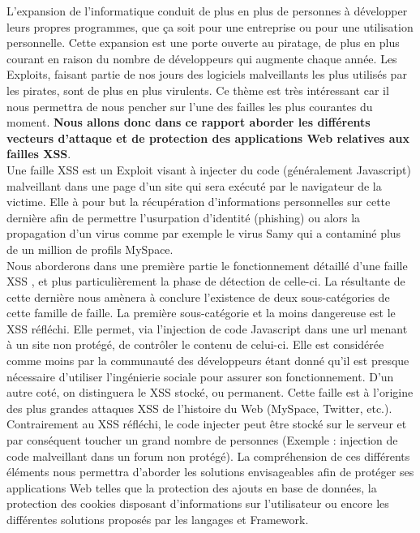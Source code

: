 \documentclass[a4paper,12pt]{report}
\begin{document}
L’expansion de l’informatique conduit de plus en plus de personnes à développer leurs propres programmes, que ça soit pour une entreprise ou pour une utilisation personnelle. Cette expansion est une porte ouverte au piratage, de plus en plus courant en raison du nombre de développeurs qui augmente chaque année. Les Exploits, faisant partie de nos jours des logiciels malveillants les plus utilisés par les pirates, sont de plus en plus virulents.
Ce thème est très intéressant car il nous permettra de nous pencher sur l'une des failles les plus courantes du moment. \textbf{Nous allons donc dans ce rapport aborder les différents vecteurs d'attaque et de protection des applications Web relatives aux failles XSS}.\\

Une faille XSS est un Exploit visant à injecter du code (généralement Javascript) malveillant dans une page d'un site qui sera exécuté par le navigateur de la victime. Elle à pour but la récupération d'informations personnelles sur cette dernière afin de permettre l'usurpation d'identité (phishing) ou alors la propagation d'un virus comme par exemple le virus Samy qui a  contaminé plus de un million de profils MySpace. \\

Nous aborderons dans une première partie le fonctionnement détaillé d'une faille XSS , et plus particulièrement la phase de détection de celle-ci. La résultante de cette dernière nous amènera à conclure l'existence de deux sous-catégories de cette famille de faille. La première sous-catégorie et la moins dangereuse est le XSS réfléchi. Elle permet, via l'injection de code Javascript dans une url menant à un site non protégé, de contrôler le contenu de celui-ci. Elle est considérée comme moins par la communauté des développeurs étant donné qu'il est presque nécessaire d'utiliser l'ingénierie sociale pour assurer son fonctionnement. D'un autre coté, on distinguera le XSS stocké, ou permanent. Cette faille est à l'origine des plus grandes attaques XSS de l'histoire du Web (MySpace, Twitter, etc.). Contrairement au XSS réfléchi, le code injecter peut être stocké sur le serveur et par conséquent toucher un grand nombre de personnes (Exemple : injection de code malveillant dans un forum non protégé). La compréhension de ces différents éléments nous permettra d'aborder les solutions envisageables afin de protéger ses applications Web telles que la protection des ajouts en base de données, la protection des cookies disposant d'informations sur l'utilisateur ou encore les différentes solutions proposés par les langages et Framework.  \\
\end{document}
